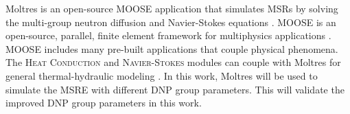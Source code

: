 
Moltres is an open-source \gls{MOOSE} application that simulates \glspl{MSR} by solving the multi-group neutron diffusion and Navier-Stokes equations \cite{lindsay_introduction_2018}.
\gls{MOOSE} is an open-source, parallel, finite element framework for multiphysics applications \cite{giudicelli2024moose}.
\gls{MOOSE} includes many pre-built applications that couple physical phenomena.
The \textsc{Heat Conduction} and \textsc{Navier-Stokes} modules can couple with Moltres for general thermal-hydraulic modeling \cite{permann2020moose, lindsay2023moose, peterson2018overview, park2022verification}.
In this work, Moltres will be used to simulate the \gls{MSRE} with different \gls{DNP} group parameters.
This will validate the improved \gls{DNP} group parameters in this work.